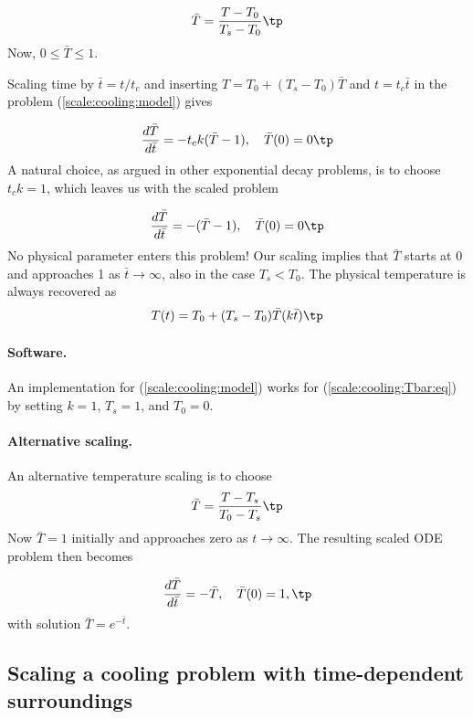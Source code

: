 \documentclass[graybox,envcountchap,sectrefs,final]{svmonodo}
\begin{document}
\begin{equation}
\bar T = \frac{T-T_0}{T_s-T_0}
\label{scale:cooling:Tbar}
\tp
\end{equation}
Now, $0\leq \bar T\leq 1$.

Scaling time by $\bar t = t/t_c$ and inserting
$T= T_0 + (T_s-T_0)\bar T$ and $t=t_c\bar t$ in the
problem (\ref{scale:cooling:model}) gives

\[ \frac{d\bar T}{d\bar t} = - t_ck(\bar T - 1),\quad \bar T(0) = 0
\tp
\]
A natural choice, as argued in other exponential decay problems,
is to choose $t_ck=1$, which leaves us with the scaled problem

\begin{equation}
\frac{d\bar T}{d\bar t} = - (\bar T - 1),\quad \bar T(0)=0
\label{scale:cooling:Tbar:eq}
\tp
\end{equation}
No physical parameter enters this problem!
Our scaling implies that $\bar T$ starts at
0 and approaches 1 as $\bar t\rightarrow\infty$, also in the case
$T_s < T_0$. The physical temperature is always recovered as
\begin{equation}
T(t) = T_0 + (T_s-T_0)\bar T (k\bar t)
\label{scale:cooling:T}
\tp
\end{equation}

\paragraph{Software.}
An implementation for (\ref{scale:cooling:model}) works for
(\ref{scale:cooling:Tbar:eq}) by setting $k=1$, $T_s=1$, and $T_0=0$.

\paragraph{Alternative scaling.}
An alternative temperature scaling is to choose
\begin{equation}
\bar T = \frac{T-T_s}{T_0-T_s}
\label{scale:cooling:Tbar2}
\tp
\end{equation}
Now $\bar T=1$ initially and approaches zero as $t\rightarrow\infty$.
The resulting scaled ODE problem then becomes

\begin{equation}
\frac{d\bar T}{d\bar t} = - \bar T,\quad \bar T(0)=1,
\label{scale:cooling:Tbar:eq2}
\tp
\end{equation}
with solution $\bar T = e^{-\bar t}$.

\subsection{Scaling a cooling problem with time-dependent surroundings}
\label{scale:cooling:osc}
\end{document}
